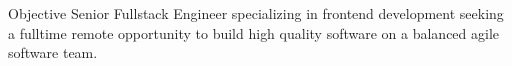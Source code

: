 \begin{section}{Objective}
  Senior Fullstack Engineer specializing in frontend development seeking a fulltime remote opportunity to build high quality software on a balanced agile software team.
\end{section}

